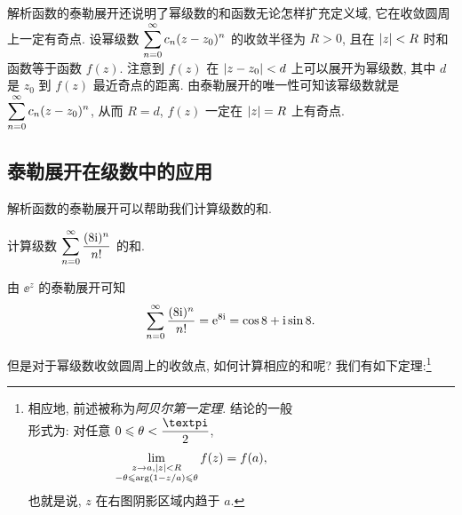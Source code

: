 解析函数的泰勒展开还说明了幂级数的和函数无论怎样扩充定义域, 它在收敛圆周上一定有奇点.
设幂级数 $\displaystyle\sum_{n=0}^{\infty}c_n(z-z_0)^n$ 的收敛半径为 $R>0$, 且在 $\lvert z\rvert<R$ 时和函数等于函数 $f(z)$.
注意到 $f(z)$ 在 $\lvert z-z_0\rvert<d$ 上可以展开为幂级数, 其中 $d$ 是 $z_0$ 到 $f(z)$ 最近奇点的距离.
由泰勒展开的唯一性可知该幂级数就是 $\displaystyle\sum_{n=0}^{\infty}c_n(z-z_0)^n$, 从而 $R=d$, $f(z)$ 一定在 $\lvert z\rvert=R$ 上有奇点.


\subsection{泰勒展开在级数中的应用\optional}

解析函数的泰勒展开可以帮助我们计算级数的和.

\begin{example}
  计算级数 $\displaystyle\sum_{n=0}^{\infty} \frac{(8\mathrm{i})^n}{n!}$ 的和.
\end{example}

\begin{solution}
  由 $\ee^z$ 的泰勒展开可知
  \[
     \displaystyle\sum_{n=0}^{\infty} \frac{(8\mathrm{i})^n}{n!}
    =\mathrm{e}^{8\mathrm{i}}
    =\cos 8+\mathrm{i} \sin 8.
  \]
\end{solution}

但是对于幂级数收敛圆周上的收敛点, 如何计算相应的和呢?
我们有如下定理:\footnote{%
  相应地, 前述\thmAF 被称为\emph{阿贝尔第一定理}. \thmAS 结论的一般\\
  形式为: 对任意 $0\le \theta<\dfrac\cpi2$,
  \begin{align*}
    \lim_{\substack{z\rightarrow a,\lvert z\rvert<R\\-\theta\leqslant\arg (1-z/a)\leqslant\theta}}f(z)=f(a),\qquad\qquad\qquad&&&
  \end{align*}
  也就是说, $z$ 在右图阴影区域内趋于 $a$.
}

